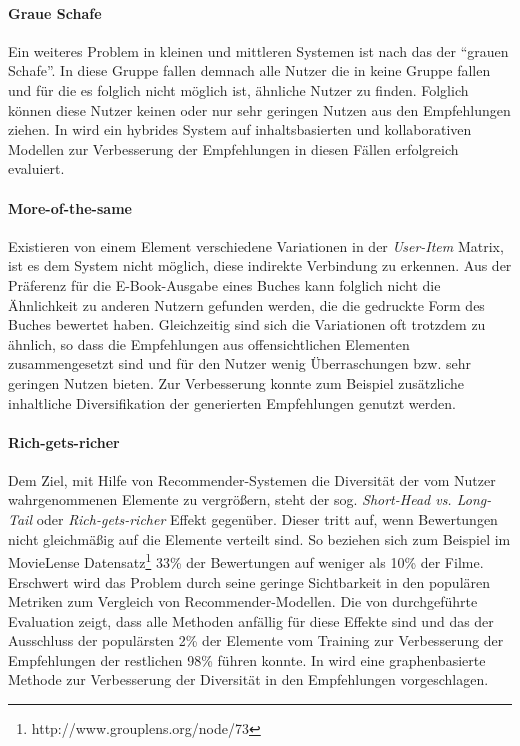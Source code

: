 \paragraph{Graue Schafe} Ein weiteres Problem in kleinen und mittleren Systemen ist nach \citep{claypool99} das der ``grauen Schafe''. In diese Gruppe fallen demnach alle Nutzer die in keine Gruppe fallen und für die es folglich nicht möglich ist, ähnliche Nutzer zu finden. Folglich können diese Nutzer keinen oder nur sehr geringen Nutzen aus den Empfehlungen ziehen. In \citep{claypool99} wird ein hybrides System auf inhaltsbasierten und kollaborativen Modellen zur Verbesserung der Empfehlungen in diesen Fällen erfolgreich evaluiert. \citep{Burke:2002:HRS:586321.586352}

\paragraph{More-of-the-same} Existieren von einem Element verschiedene Variationen in der \textit{User-Item} Matrix, ist es dem System nicht möglich, diese indirekte Verbindung zu erkennen. Aus der Präferenz für die E-Book-Ausgabe eines Buches kann folglich nicht die Ähnlichkeit zu anderen Nutzern gefunden werden, die die gedruckte Form des Buches bewertet haben. Gleichzeitig sind sich die Variationen oft trotzdem zu ähnlich, so dass die Empfehlungen aus offensichtlichen Elementen zusammengesetzt sind und für den Nutzer wenig Überraschungen bzw. sehr geringen Nutzen bieten. Zur Verbesserung konnte zum Beispiel zusätzliche inhaltliche Diversifikation der generierten Empfehlungen genutzt werden. \citep[Kap. 3]{rs}

\paragraph{Rich-gets-richer}\label{sec:richgetsricher} Dem Ziel, mit Hilfe von Recommender-Systemen die Diversität der vom Nutzer wahrgenommenen Elemente zu vergrößern, steht der sog. \textit{Short-Head vs. Long-Tail} oder \textit{Rich-gets-richer} Effekt gegenüber. Dieser tritt auf, wenn Bewertungen nicht gleichmäßig auf die Elemente verteilt sind. So beziehen sich zum Beispiel im MovieLense Datensatz\footnote{http://www.grouplens.org/node/73} 33\% der Bewertungen auf weniger als 10\% der Filme. Erschwert wird das Problem durch seine geringe Sichtbarkeit in den populären Metriken zum Vergleich von Recommender-Modellen. Die von \citep{Cremonesi:2010:PRA:1864708.1864721} durchgeführte Evaluation zeigt, dass alle Methoden anfällig für diese Effekte sind und das der Ausschluss der populärsten 2\% der Elemente vom Training zur Verbesserung der Empfehlungen der restlichen 98\% führen konnte. In \citep{Yin:2012:CLT:2311906.2311916} wird eine graphenbasierte Methode zur Verbesserung der Diversität in den Empfehlungen vorgeschlagen.

